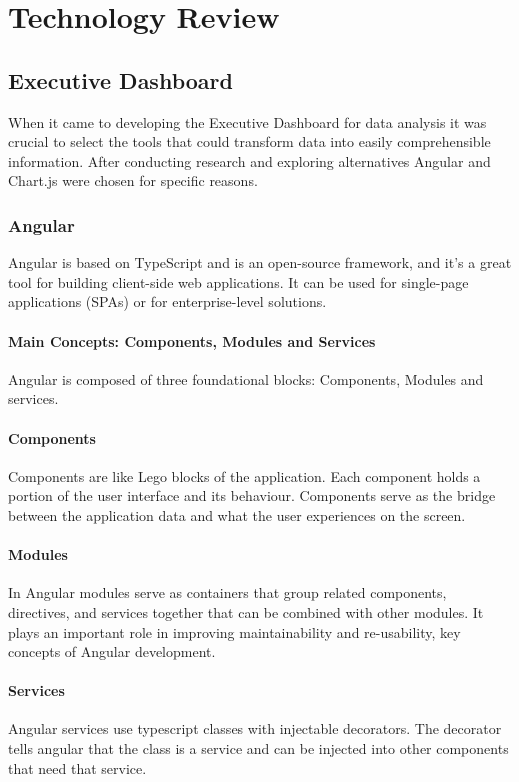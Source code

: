 \chapter{Technology Review}

\section{Executive Dashboard}
When it came to developing the Executive Dashboard for data analysis it was crucial to select the tools that could transform data into easily comprehensible information. After conducting research and exploring alternatives Angular and Chart.js were chosen for specific reasons.

\subsection{Angular}
Angular is based on TypeScript and is an open-source framework, and it's a great tool for building client-side web applications. It can be used for single-page applications (SPAs) or for enterprise-level solutions. 

\subsubsection{Main Concepts: Components, Modules and Services}
Angular is composed of three foundational blocks: Components, Modules and services.

\subsubsection{Components} Components are like Lego blocks of the application. Each component holds a portion of the user interface and its behaviour. Components serve as the bridge between the application data and what the user experiences on the screen.\cite{angular-components}

\subsubsection{Modules} In Angular modules serve as containers that group related components, directives, and services together that can be combined with other modules. It plays an important role in improving maintainability and re-usability, key concepts of Angular development.\cite{angular-modules}

\subsubsection{Services} Angular services use typescript classes with injectable decorators. The decorator tells angular that the class is a service and can be injected into other components that need that service.\cite{angular-services}


